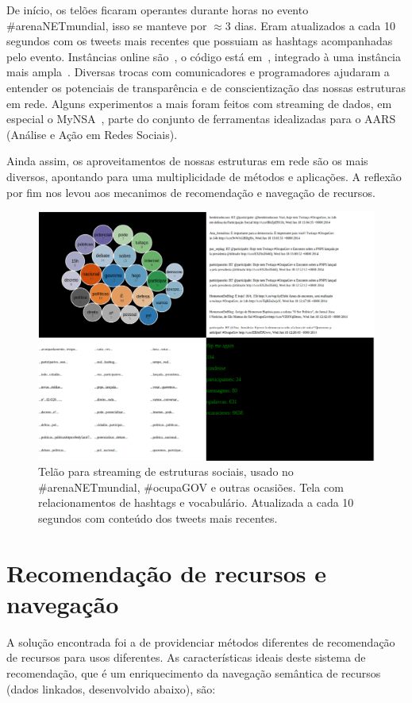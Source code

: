\documentclass[a4paper, 11pt]{article} %
\begin{document}
De início, os telões ficaram operantes durante horas no evento \#arenaNETmundial, isso se manteve por $\approx 3$ dias. Eram atualizados a cada 10 segundos com os tweets mais recentes que possuiam as hashtags acompanhadas pelo evento. Instâncias online são~\cite{ocupagov,mmissa,mmissa2}, o código está em~\cite{codTelao}, integrado à uma instância mais ampla~\cite{mmissa2}. Diversas trocas com comunicadores e programadores ajudaram a entender os potenciais de transparência e de conscientização das nossas estruturas em rede. Alguns experimentos a mais foram feitos com streaming de dados, em especial o MyNSA~\cite{mynsa}, parte do conjunto de ferramentas idealizadas para o AARS (Análise e Ação em Redes Sociais).

Ainda assim, os aproveitamentos de nossas estruturas em rede são os mais diversos, apontando para uma multiplicidade de métodos e aplicações. A reflexão por fim nos levou aos mecanimos de recomendação e navegação de recursos.
\begin{figure}[h!]
  \centering
    \includegraphics[width=.7\textwidth]{telao2.png}
  \caption{\small Telão para streaming de estruturas sociais, usado no \#arenaNETmundial, \#ocupaGOV e outras ocasiões. Tela com relacionamentos de hashtags e vocabulário. Atualizada a cada 10 segundos com conteúdo dos tweets mais recentes.}\label{fig:telao2}
\end{figure}


\section*{Recomendação de recursos e navegação}
A solução encontrada foi a de providenciar métodos diferentes de recomendação de recursos para usos diferentes. As características ideais deste sistema de recomendação, que é um enriquecimento da navegação semântica de recursos (dados linkados, desenvolvido abaixo), são:
\end{document}

